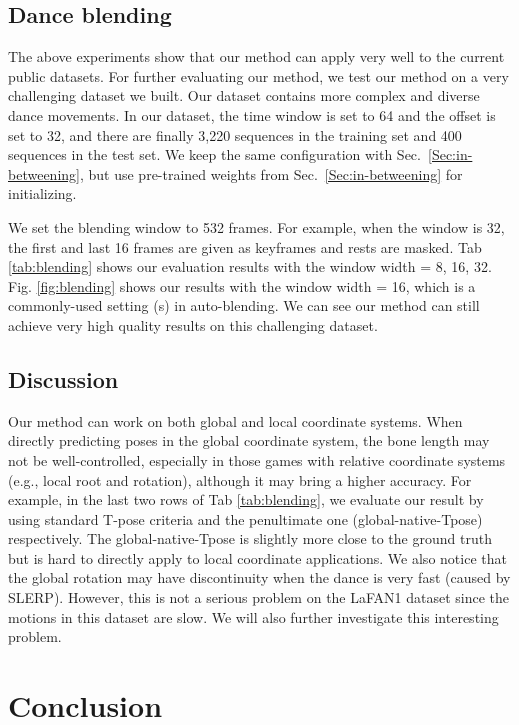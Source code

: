 \documentclass[10pt,twocolumn,letterpaper]{article}
\begin{document}
\subsection{Dance blending}

The above experiments show that our method can apply very well to the current public datasets. For further evaluating our method, we test our method on a very challenging dataset we built. Our dataset contains more complex and diverse dance movements. In our dataset, the time window is set to 64 and the offset is set to 32, and there are finally 3,220 sequences in the training set and 400 sequences in the test set. We keep the same configuration with Sec.~\ref{Sec:in-betweening}, but use pre-trained weights from Sec.~\ref{Sec:in-betweening} for initializing.

We set the blending window to 532 frames. For example, when the window is 32, the first and last 16 frames are given as keyframes and rests are masked. Tab \ref{tab:blending} shows our evaluation results with the window width = 8, 16, 32. Fig. \ref{fig:blending} shows our results with the window width = 16, which is a commonly-used setting (s) in auto-blending. We can see our method can still achieve very high quality results on this challenging dataset.

\subsection{Discussion}

Our method can work on both global and local coordinate systems. When directly predicting poses in the global coordinate system, the bone length may not be well-controlled, especially in those games with relative coordinate systems (e.g., local root and rotation), although it may bring a higher accuracy. For example, in the last two rows of Tab \ref{tab:blending}, we evaluate our result by using standard T-pose criteria and the penultimate one (global-native-Tpose) respectively. The global-native-Tpose is slightly more close to the ground truth but is hard to directly apply to local coordinate applications. We also notice that the global rotation may have discontinuity when the dance is very fast (caused by SLERP). However, this is not a serious problem on the LaFAN1 dataset since the motions in this dataset are slow. We will also further investigate this interesting problem.

\section{Conclusion}
\end{document}
